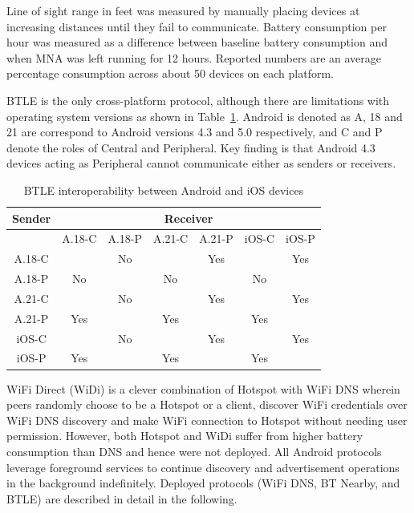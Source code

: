 \documentclass[conference]{IEEEtran}
\begin{document}
Line of sight range in feet was measured by manually placing devices
at increasing distances until they fail to communicate. Battery
consumption per hour was measured as a difference between baseline
battery consumption and when MNA was left running for 12
hours. Reported numbers are an average percentage consumption across
about 50 devices on each platform.

BTLE is the only cross-platform protocol, although there are
limitations with operating system versions as shown in
Table~\ref{tab:android_ios}. Android is denoted as A, 18 and 21 are
correspond to Android versions 4.3 and 5.0 respectively, and C and P
denote the roles of Central and Peripheral. Key finding is that
Android 4.3 devices acting as Peripheral cannot communicate either as
senders or receivers.
%
\begin{table}[H]
\caption{BTLE interoperability between Android and iOS devices}
\label{tab:android_ios}
\centering
\begin{tabular}{|c|c|c|c|c|c|c|}
\hline 
\multicolumn{1}{|c|}{Sender} & \multicolumn{6}{c|}{Receiver} \\
\hline
\multicolumn{1}{|c|}{} & A.18-C & A.18-P & A.21-C & A.21-P  & iOS-C & iOS-P \\
\hline
A.18-C & \cellcolor{Gray}         &   No       & \cellcolor{Gray}         &    Yes       &  \cellcolor{Gray}       &   Yes      \\ 
\hline
A.18-P &  No        & \cellcolor{Gray}         &   No       &  \cellcolor{Gray}         &   No      &  \cellcolor{Gray}       \\ 
\hline
A.21-C & \cellcolor{Gray}         &   No       &  \cellcolor{Gray}        &    Yes       &  \cellcolor{Gray}       &   Yes      \\ 
\hline
A.21-P &  Yes        & \cellcolor{Gray}         &   Yes       &  \cellcolor{Gray}         &   Yes      & \cellcolor{Gray}        \\ 
\hline
iOS-C & \cellcolor{Gray}         &    No      &  \cellcolor{Gray}        &     Yes       & \cellcolor{Gray}        &   Yes      \\ 
\hline
iOS-P &   Yes       & \cellcolor{Gray}         &    Yes      &  \cellcolor{Gray}         &   Yes      &  \cellcolor{Gray}       \\ 
\hline
\end{tabular}
\end{table}
%

WiFi Direct (WiDi) is a clever combination of Hotspot with WiFi DNS
wherein peers randomly choose to be a Hotspot or a client, discover
WiFi credentials over WiFi DNS discovery and make WiFi connection to
Hotspot without needing user permission.  However, both Hotspot and
WiDi suffer from higher battery consumption than DNS and hence were
not deployed. All Android protocols leverage foreground services to
continue discovery and advertisement operations in the background
indefinitely. Deployed protocols (WiFi DNS, BT Nearby, and BTLE) are
described in detail in the following.
\end{document}
